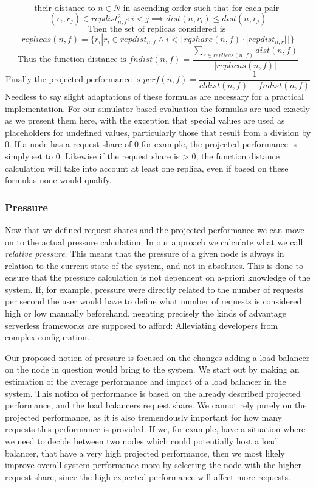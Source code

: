\[\text{their distance to }n \in N \text{ in ascending order such that for each pair } \]
\[(r_{i},r_{j}) \in repdist_{n,f}^{2}: i < j \implies dist(n, r_{i}) \leq dist(n, r_{j})\]
\[\text{Then the set of replicas considered is } \]
\[replicas(n,f) = \{r_{i} | r_{i} \in repdist_{n,f} \land i < \lfloor rqshare(n,f) \cdot |repdist_{n,r}| \rfloor\}\]
\[\text{Thus the function distance is }fndist(n,f) = \frac{\sum_{r \in replicas(n,f)}dist(n,f)}{|replicas(n,f)|} \]
\[\text{Finally the projected performance is }perf(n,f) = \frac{1}{cldist(n,f) + fndist(n,f)} \]
Needless to say slight adaptations of these formulas are necessary for a practical implementation.
For our simulator based evaluation the formulas are used exactly as we present them here, with the exception that special values are used as placeholders for undefined values, particularly those that result from a division by 0.
If a node has a request share of 0 for example, the projected performance is simply set to 0.
Likewise if the request share is > 0, the function distance calculation will take into account at least one replica, even if based on these formulas none would qualify.


\subsubsection{Pressure}
Now that we defined request shares and the projected performance we can move on to the actual pressure calculation.
In our approach we calculate what we call \textit{relative pressure}.
This means that the pressure of a given node is always in relation to the current state of the system, and not in absolutes.
This is done to ensure that the pressure calculation is not dependent on a-priori knowledge of the system.
If, for example, pressure were directly related to the number of requests per second the user would have to define what number of requests is considered high or low manually beforehand, negating precisely the kinds of advantage serverless frameworks are supposed to afford: Alleviating developers from complex configuration.

Our proposed notion of pressure is focused on the changes adding a load balancer on the node in question would bring to the system.
We start out by making an estimation of the average performance and impact of a load balancer in the system.
This notion of performance is based on the already described projected performance, and the load balancers request share.
We cannot rely purely on the projected performance, as it is also tremendously important for how many requests this performance is provided.
If we, for example, have a situation where we need to decide between two nodes which could potentially host a load balancer, that have a very high projected performance, then we most likely improve overall system performance more by selecting the node with the higher request share, since the high expected performance will affect more requests.

